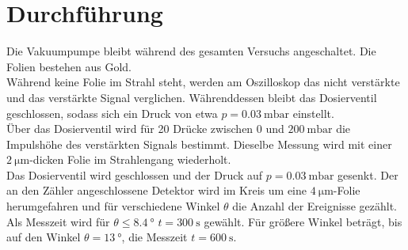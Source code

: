 \section{Durchführung}
\label{sec:Durchführung}

Die Vakuumpumpe bleibt während des gesamten Versuchs angeschaltet.
Die Folien bestehen aus Gold.\\
\newline
Während keine Folie im Strahl steht, werden am Oszilloskop das nicht verstärkte und das verstärkte Signal verglichen. Währenddessen bleibt das Dosierventil geschlossen, sodass sich ein Druck von etwa $p=\SI{0,03}{\milli\bar}$ einstellt.\\
Über das Dosierventil wird für 20 Drücke zwischen $0$ und $\SI{200}{\milli\bar}$ die Impulshöhe des verstärkten Signals bestimmt.
Dieselbe Messung wird mit einer $\SI{2}{\micro\meter}$-dicken Folie im Strahlengang wiederholt.\\
Das Dosierventil wird geschlossen und der Druck auf $p=\SI{0,03}{\milli\bar}$ gesenkt.
Der an den Zähler angeschlossene Detektor wird im Kreis um eine $\SI{4}{\micro\meter}$-Folie herumgefahren und für verschiedene Winkel $\theta$ die Anzahl der Ereignisse gezählt. Als Messzeit wird für $\theta\leq\SI{8,4}{\degree}$ $t=\SI{300}{\second}$ gewählt. Für größere Winkel beträgt, bis auf den Winkel $\theta=\SI{13}{\degree}$, die Messzeit $t=\SI{600}{\second}$.


